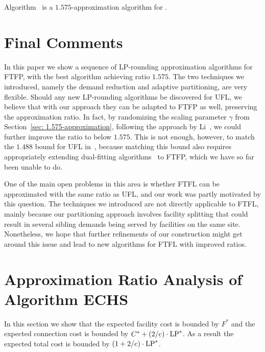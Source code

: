 \documentclass{llncs}
\begin{document}
\begin{theorem}\label{thm:ebgs}
  Algorithm~{\EBGS} is a $1.575$-approximation algorithm for \FTFP.
\end{theorem}



\section{Final Comments}

In this paper we show a sequence of LP-rounding approximation algorithms
for FTFP, with the best algorithm achieving  ratio $1.575$. The two techniques we introduced,
namely the demand reduction and adaptive partitioning, are very flexible. Should any new
LP-rounding algorithms be discovered for UFL, we believe that with our approach they can be
adapted to FTFP as well, preserving the approximation ratio. In fact, by randomizing the
scaling parameter $\gamma$ from Section~\ref{sec: 1.575-approximation},
following the approach by Li~\cite{Li11}, we
could further improve the ratio to below $1.575$. This is not enough, however, to
match the $1.488$ bound for UFL in~\cite{Li11}, because matching this bound
also requires appropriately extending dual-fitting algorithms~\cite{MahdianYZ06}
to FTFP, which we have so far been unable to do.

One of the main open problems in this area is whether FTFL can be approximated with the
same ratio as UFL, and our work was partly motivated by this question. The techniques we
introduced are not directly applicable to FTFL, mainly because our partitioning
approach involves facility splitting that could result in several sibling demands being served
by facilities on the same site. Nonetheless, we hope that further refinements of 
our construction might get around this issue and
lead to new algorithms for FTFL with improved ratios.

\vfill
\eject



\pagebreak


\appendix
\section{Approximation Ratio Analysis of Algorithm ECHS}
\label{app: 1.736 analysis}
In this section we show that the expected facility cost is bounded by
$F^\ast$ and the expected connection cost is bounded by $C^\ast +
(2/e) \cdot \mbox{\rm LP}^\ast$. As a result the expected total cost is bounded
by $(1 + 2/e)\cdot \mbox{\rm LP}^\ast$.
\end{document}
